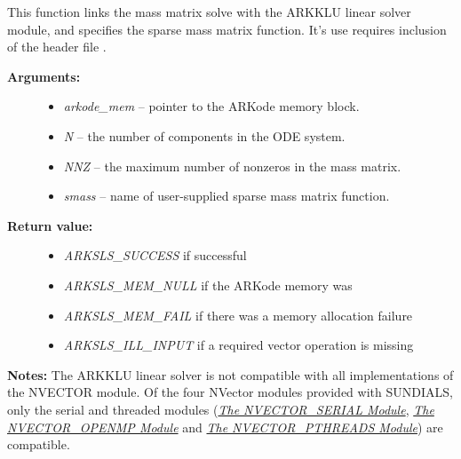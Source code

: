 \documentclass[letterpaper,10pt,english]{sphinxmanual}
\begin{document}
\begin{fulllineitems}
\label{c_interface/User_callable:ARKMassKLU}
This function links the mass matrix solve with the ARKKLU linear
solver module, and specifies the sparse mass matrix function.  It's
use requires inclusion of the header file .
\begin{description}
\item[{\textbf{Arguments:}}] \leavevmode\begin{itemize}
\item {} 
\emph{arkode\_mem} -- pointer to the ARKode memory block.

\item {} 
\emph{N} -- the number of components in the ODE system.

\item {} 
\emph{NNZ} -- the maximum number of nonzeros in the mass matrix.

\item {} 
\emph{smass} -- name of user-supplied sparse mass matrix function.

\end{itemize}

\item[{\textbf{Return value:}}] \leavevmode\begin{itemize}
\item {} 
\emph{ARKSLS\_SUCCESS}   if successful

\item {} 
\emph{ARKSLS\_MEM\_NULL}  if the ARKode memory was 

\item {} 
\emph{ARKSLS\_MEM\_FAIL}  if there was a memory allocation failure

\item {} 
\emph{ARKSLS\_ILL\_INPUT} if a required vector operation is missing

\end{itemize}

\end{description}

\textbf{Notes:}  The ARKKLU linear solver is not compatible with all
implementations of the NVECTOR module. Of the four NVector
modules provided with SUNDIALS, only the serial and threaded
modules ({\hyperref[nvectors/NVector_Serial:nvectors-nvserial]{\emph{The NVECTOR\_SERIAL Module}}}, {\hyperref[nvectors/NVector_OpenMP:nvectors-openmp]{\emph{The NVECTOR\_OPENMP Module}}} and
{\hyperref[nvectors/NVector_Pthreads:nvectors-pthreads]{\emph{The NVECTOR\_PTHREADS Module}}}) are compatible.

\end{fulllineitems}
\end{document}
